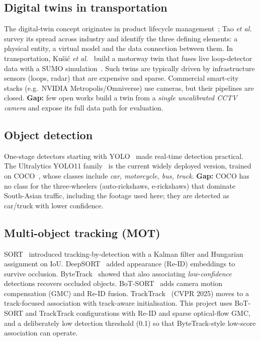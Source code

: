 \documentclass[11pt,a4paper]{article}
\begin{document}
\subsection{Digital twins in transportation}
The digital-twin concept originates in product lifecycle management~\cite{grieves2017}; Tao \emph{et al.}~\cite{tao2019}
survey its spread across industry and identify the three defining elements: a physical entity, a virtual model and
the data connection between them. In transportation, Ku\v{s}i\'{c} \emph{et al.}~\cite{kusic2023} build a motorway twin
that fuses live loop-detector data with a SUMO simulation~\cite{sumo2018}. Such twins are typically driven by
infrastructure sensors (loops, radar) that are expensive and sparse. Commercial smart-city stacks (e.g.\ NVIDIA
Metropolis/Omniverse) use cameras, but their pipelines are closed. \textbf{Gap:} few open works build a twin from a
\emph{single uncalibrated CCTV camera} and expose its full data path for evaluation.

\subsection{Object detection}
One-stage detectors starting with YOLO~\cite{redmon2016} made real-time detection practical. The Ultralytics YOLO11
family~\cite{yolo11} is the current widely deployed version, trained on COCO~\cite{coco2014}, whose classes include
\emph{car, motorcycle, bus, truck}. \textbf{Gap:} COCO has no class for the three-wheelers (auto-rickshaws, e-rickshaws)
that dominate South-Asian traffic, including the footage used here; they are detected as car/truck with lower confidence.

\subsection{Multi-object tracking (MOT)}
SORT~\cite{bewley2016} introduced tracking-by-detection with a Kalman filter and Hungarian assignment on IoU.
DeepSORT~\cite{wojke2017} added appearance (Re-ID) embeddings to survive occlusion. ByteTrack~\cite{zhang2022} showed
that also associating \emph{low-confidence} detections recovers occluded objects. BoT-SORT~\cite{aharon2022} adds camera
motion compensation (GMC) and Re-ID fusion. TrackTrack~\cite{shim2025} (CVPR 2025) moves to a track-focused
association with track-aware initialisation. This project uses BoT-SORT and TrackTrack configurations with Re-ID and
sparse optical-flow GMC, and a deliberately low detection threshold (0.1) so that ByteTrack-style low-score
association can operate.
\end{document}
